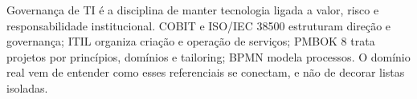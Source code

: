 \begin{resumo}
Governança de TI é a disciplina de manter tecnologia ligada a valor, risco e responsabilidade institucional. COBIT e ISO/IEC 38500 estruturam direção e governança; ITIL organiza criação e operação de serviços; PMBOK 8 trata projetos por princípios, domínios e tailoring; BPMN modela processos. O domínio real vem de entender como esses referenciais se conectam, e não de decorar listas isoladas.
\end{resumo}
